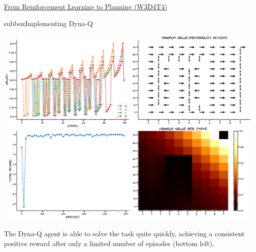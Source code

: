 \begin{textbox}{\href{https://compneuro.neuromatch.io/tutorials/W3D4_ReinforcementLearning/student/W3D4_Tutorial4.html}{From Reinforcement Learning to Planning (W3D4T4)} }
\begin{subbox}{subbox}{Implementing Dyna-Q}
\begin{center}
\includegraphics[scale=0.16]{Figures/RL/RL_Figure17.png}
\end{center}

The Dyna-Q agent is able to solve the task quite quickly, achieving a consistent positive reward after only a limited number of episodes (bottom left).

\end{subbox}
\end{textbox}
